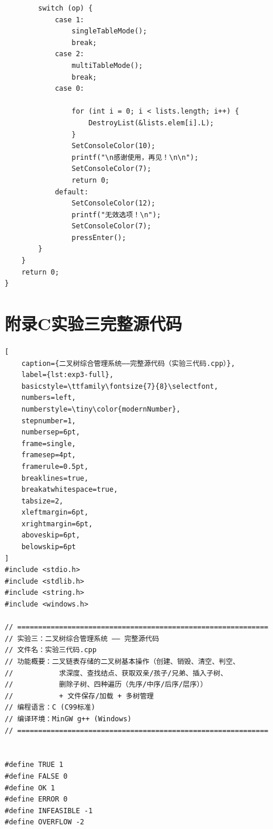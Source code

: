 \documentclass[supercite]{Experimental_Report}
\begin{document}
{\begin{lstlisting}
        switch (op) {
            case 1:
                singleTableMode();
                break;
            case 2:
                multiTableMode();
                break;
            case 0:

                for (int i = 0; i < lists.length; i++) {
                    DestroyList(&lists.elem[i].L);
                }
                SetConsoleColor(10);
                printf("\n感谢使用，再见！\n\n");
                SetConsoleColor(7);
                return 0;
            default:
                SetConsoleColor(12);
                printf("无效选项！\n");
                SetConsoleColor(7);
                pressEnter();
        }
    }
    return 0;
}
\end{lstlisting}

\newpage

\section*{附录C\quad 实验三完整源代码}


\begin{lstlisting}[
    caption={二叉树综合管理系统——完整源代码（实验三代码.cpp）},
    label={lst:exp3-full},
    basicstyle=\ttfamily\fontsize{7}{8}\selectfont,
    numbers=left,
    numberstyle=\tiny\color{modernNumber},
    stepnumber=1,
    numbersep=6pt,
    frame=single,
    framesep=4pt,
    framerule=0.5pt,
    breaklines=true,
    breakatwhitespace=true,
    tabsize=2,
    xleftmargin=6pt,
    xrightmargin=6pt,
    aboveskip=6pt,
    belowskip=6pt
]
#include <stdio.h>
#include <stdlib.h>
#include <string.h>
#include <windows.h>

// ============================================================
// 实验三：二叉树综合管理系统 —— 完整源代码
// 文件名：实验三代码.cpp
// 功能概要：二叉链表存储的二叉树基本操作（创建、销毁、清空、判空、
//           求深度、查找结点、获取双亲/孩子/兄弟、插入子树、
//           删除子树、四种遍历（先序/中序/后序/层序））
//           + 文件保存/加载 + 多树管理
// 编程语言：C (C99标准)
// 编译环境：MinGW g++ (Windows)
// ============================================================


#define TRUE 1
#define FALSE 0
#define OK 1
#define ERROR 0
#define INFEASIBLE -1
#define OVERFLOW -2


\end{lstlisting}}
\end{document}

